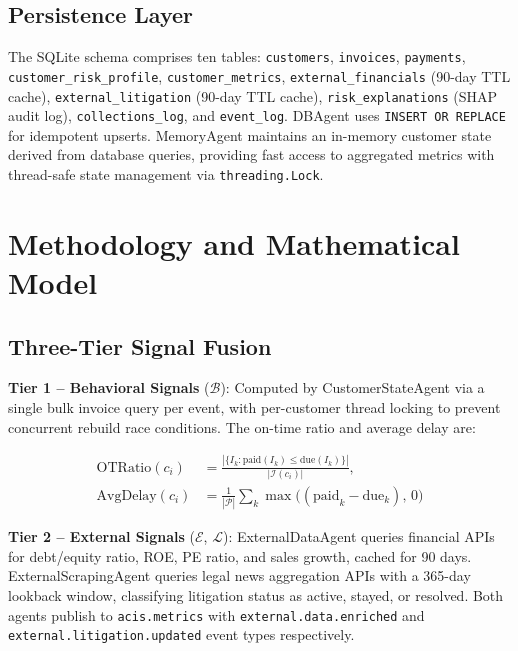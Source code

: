 ﻿\documentclass[runningheads]{llncs}
\begin{document}
\subsection{Persistence Layer}

The SQLite schema comprises ten tables: \texttt{customers}, \texttt{invoices}, \texttt{payments}, \texttt{customer\allowbreak \_risk\allowbreak \_profile}, \texttt{customer\_metrics}, \texttt{external\allowbreak \_financials} (90-day TTL cache), \texttt{external\allowbreak \_litigation} (90-day TTL cache), \texttt{risk\allowbreak \_explanations} (SHAP audit log), \texttt{collections\_log}, and \texttt{event\_log}. DBAgent uses \texttt{INSERT OR\allowbreak\ REPLACE} for idempotent upserts. MemoryAgent maintains an in-memory customer state derived from database queries, providing fast access to aggregated metrics with thread-safe state management via \texttt{threading.Lock}.

\section{Methodology and Mathematical Model}
\label{sec:methodology}

\subsection{Three-Tier Signal Fusion}

\textbf{Tier 1 -- Behavioral Signals} ($\mathcal{B}$): Computed by CustomerStateAgent via a single bulk invoice query per event, with per-customer thread locking to prevent concurrent rebuild race conditions. The on-time ratio and average delay are:

\begin{equation}
\begin{split}
\text{OTRatio}(c_i) &= \frac{|\{I_k : \text{paid}(I_k)\leq\text{due}(I_k)\}|}{|\mathcal{I}(c_i)|}, \\
\text{AvgDelay}(c_i) &= \frac{1}{|\mathcal{P}|}\sum_{k}\max\bigl((\text{paid}_k - \text{due}_k),\,0\bigr)
\end{split}
\label{eq:behavioral}
\end{equation}

\textbf{Tier 2 -- External Signals} ($\mathcal{E}$, $\mathcal{L}$): ExternalDataAgent queries financial APIs for debt/equity ratio, ROE, PE ratio, and sales growth, cached for 90 days. ExternalScrapingAgent queries legal news aggregation APIs with a 365-day lookback window, classifying litigation status as active, stayed, or resolved. Both agents publish to \texttt{acis.metrics} with \texttt{external.\allowbreak data.\allowbreak enriched} and \texttt{external.\allowbreak litigation.\allowbreak updated} event types respectively.
\end{document}

